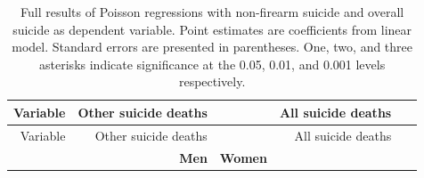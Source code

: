 \documentclass[]{article}
\begin{document}
\begin{longtable}[c]{@{}rrrrr@{}}
\caption{Full results of Poisson regressions with non-firearm suicide
and overall suicide as dependent variable. Point estimates are
coefficients from linear model. Standard errors are presented in
parentheses. One, two, and three asterisks indicate significance at the
0.05, 0.01, and 0.001 levels respectively.}\tabularnewline
\toprule
\begin{minipage}[b]{0.17\columnwidth}\raggedleft\strut
Variable
\strut\end{minipage} &
\begin{minipage}[b]{0.20\columnwidth}\raggedleft\strut
Other suicide deaths
\strut\end{minipage} &
\begin{minipage}[b]{0.16\columnwidth}\raggedleft\strut
~
\strut\end{minipage} &
\begin{minipage}[b]{0.18\columnwidth}\raggedleft\strut
All suicide deaths
\strut\end{minipage} &
\begin{minipage}[b]{0.15\columnwidth}\raggedleft\strut
~
\strut\end{minipage}\tabularnewline
\midrule
\endfirsthead
\toprule
\begin{minipage}[b]{0.17\columnwidth}\raggedleft\strut
Variable
\strut\end{minipage} &
\begin{minipage}[b]{0.20\columnwidth}\raggedleft\strut
Other suicide deaths
\strut\end{minipage} &
\begin{minipage}[b]{0.16\columnwidth}\raggedleft\strut
~
\strut\end{minipage} &
\begin{minipage}[b]{0.18\columnwidth}\raggedleft\strut
All suicide deaths
\strut\end{minipage} &
\begin{minipage}[b]{0.15\columnwidth}\raggedleft\strut
~
\strut\end{minipage}\tabularnewline
\midrule
\endhead
\begin{minipage}[t]{0.17\columnwidth}\raggedleft\strut
\strut\end{minipage} &
\begin{minipage}[t]{0.20\columnwidth}\raggedleft\strut
\textbf{Men}
\strut\end{minipage} &
\begin{minipage}[t]{0.16\columnwidth}\raggedleft\strut
\textbf{Women}

\end{minipage}
\end{longtable}
\end{document}
